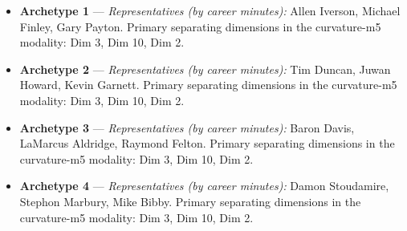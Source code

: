 \begin{itemize}
\item \textbf{Archetype 1} --- \emph{Representatives (by career minutes):} Allen Iverson, Michael Finley, Gary Payton. Primary separating dimensions in the curvature-m5 modality: Dim 3, Dim 10, Dim 2.
\item \textbf{Archetype 2} --- \emph{Representatives (by career minutes):} Tim Duncan, Juwan Howard, Kevin Garnett. Primary separating dimensions in the curvature-m5 modality: Dim 3, Dim 10, Dim 2.
\item \textbf{Archetype 3} --- \emph{Representatives (by career minutes):} Baron Davis, LaMarcus Aldridge, Raymond Felton. Primary separating dimensions in the curvature-m5 modality: Dim 3, Dim 10, Dim 2.
\item \textbf{Archetype 4} --- \emph{Representatives (by career minutes):} Damon Stoudamire, Stephon Marbury, Mike Bibby. Primary separating dimensions in the curvature-m5 modality: Dim 3, Dim 10, Dim 2.
\end{itemize}
